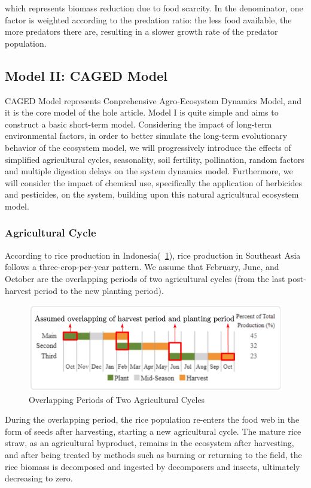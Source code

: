 \documentclass{HZNUMCM}
\begin{document}
          which represents biomass reduction due to food scarcity. 
      In the denominator, one factor is weighted according to the predation ratio: the less food available, 
      the more predators there are, resulting in a slower growth rate of the predator population.
    \subsection{Model II: CAGED Model}
      CAGED Model represents Conprehensive Agro-Ecosystem Dynamics Model, and it is the core model of the hole article.
      Model I is quite simple and aims to construct a basic short-term model. 
      Considering the impact of long-term environmental factors, 
      in order to better simulate the long-term evolutionary behavior of the ecosystem model, 
      we will progressively introduce the effects of simplified agricultural cycles, 
      seasonality, soil fertility, pollination, random factors and multiple digestion delays on the system dynamics model. 
      Furthermore, we will consider the impact of chemical use, 
      specifically the application of herbicides and pesticides, on the system, 
      building upon this natural agricultural ecosystem model.
      \subsubsection{Agricultural Cycle}
        According to rice production in Indonesia(\figurename~\ref{fig:PlantModePlus}), 
        rice production in Southeast Asia follows a three-crop-per-year pattern. 
        We assume that February, June, and October are the overlapping periods of two agricultural cycles 
        (from the last post-harvest period to the new planting period).
        \begin{figure}[H]
          \centering
          \includegraphics[width=0.7\linewidth]{images/PlantModePlus.png}
          \caption{Overlapping Periods of Two Agricultural Cycles}
          \label{fig:PlantModePlus}
        \end{figure}
        During the overlapping period, the rice population re-enters the food web in the form of seeds after harvesting, 
        starting a new agricultural cycle. The mature rice straw, as an agricultural byproduct, 
        remains in the ecosystem after harvesting, and after being treated by methods such as burning or returning to the field, 
        the rice biomass is decomposed and ingested by decomposers and insects, ultimately decreasing to zero.
\end{document}
